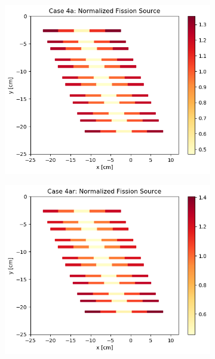 \documentclass[letterpaper,11pt]{report}
\begin{document}
\begin{figure}[H]
      \begin{subfigure}{.33\textwidth}
        \centering
        \includegraphics[width=\linewidth]{../../phase1a/case4a/analysis_output/p1a_4a_c.png}
        \caption{}
      \end{subfigure}
      \begin{subfigure}{.32\textwidth}
        \centering
        \includegraphics[width=\linewidth]{../../phase1a/case4ar/analysis_output/p1a_4ar_c.png}
        \caption{}
      \end{subfigure}
      \begin{subfigure}{.33\textwidth}

\end{subfigure}
\end{figure}
\end{document}
